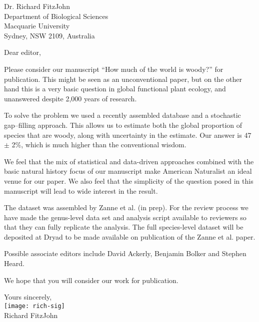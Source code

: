 \documentclass[a4paper,12pt]{article}
\begin{document}
{\raggedleft
  Dr. Richard FitzJohn\\
  Department of Biological Sciences\\
  Macquarie University\\
  Sydney, NSW 2109, Australia\\[2ex]
}

\vspace{3ex}

Dear editor,

Please consider our manuscript ``How much of the world is woody?''
for publication.  This might be seen as an unconventional paper, but
on the other hand this is a very basic question in global functional
plant ecology, and unanswered despite 2,000 years of research.

To solve the problem we used a recently assembled database and a
stochastic gap--filling approach.  This allows us to estimate both the
global proportion of species that are woody, along with uncertainty in
the estimate.  Our answer is 47 $\pm$ 2\%, which is much higher than
the conventional wisdom.

We feel that the mix of statistical and data-driven approaches
combined with the basic natural history focus of our manuscript make
American Naturalist an ideal venue for our paper.  We also feel that
the simplicity of the question posed in this manuscript will lead to
wide interest in the result.

The dataset was assembled by Zanne et al. (in prep).  For the review
process we have made the genus-level data set and analysis script
available to reviewers so that they can fully replicate the analysis.
The full species-level dataset will be deposited at Dryad to be made
available on publication of the Zanne et al. paper.

Possible associate editors include David Ackerly, Benjamin Bolker and
Stephen Heard.

We hope that you will consider our work for publication.

\vspace{2ex}
\hspace{.2\textwidth}Yours sincerely,\\[2ex]
\hspace*{.2\textwidth}
\texttt{[image: rich-sig]}\\[2ex]
\hspace*{.3\textwidth}
Richard FitzJohn
\end{document}
